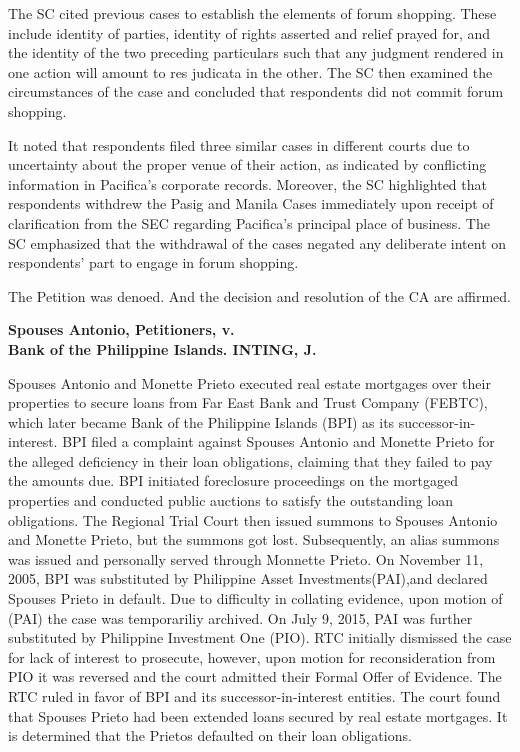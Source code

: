\documentclass[
12pt,
oneside,
onehalfspacing,
headsepline
]{DigestCollection}
\begin{document}
The SC cited previous cases to establish the elements of forum shopping. These include identity of parties, identity of rights asserted and relief prayed for, and the identity of the two preceding particulars such that any judgment rendered in one action will amount to res judicata in the other. The SC then examined the circumstances of the case and concluded that respondents did not commit forum shopping.

It noted that respondents filed three similar cases in different courts due to uncertainty about the proper venue of their action, as indicated by conflicting information in Pacifica's corporate records. Moreover, the SC highlighted that respondents withdrew the Pasig and Manila Cases immediately upon receipt of clarification from the SEC regarding Pacifica's principal place of business. The SC emphasized that the withdrawal of the cases negated any deliberate intent on respondents' part to engage in forum shopping.

The Petition was denoed. And the decision and resolution of the CA are affirmed.

\label{dab24c80-0a0f-11ef-932c-63c852f65e48}


\noindent\textbf{Spouses Antonio, Petitioners, v. \\Bank of the Philippine Islands. INTING, J.}\vspace{0.4cm}

Spouses Antonio and Monette Prieto executed real estate mortgages over their properties to secure loans from Far East Bank and Trust Company (FEBTC), which later became Bank of the Philippine Islands (BPI) as its successor-in-interest. BPI filed a complaint against Spouses Antonio and Monette Prieto for the alleged deficiency in their loan obligations, claiming that they failed to pay the amounts due. BPI initiated foreclosure proceedings on the mortgaged properties and conducted public auctions to satisfy the outstanding loan obligations. The Regional Trial Court then issued summons to Spouses Antonio and Monette Prieto, but the summons got lost. Subsequently, an alias summons was issued and personally served through Monnette Prieto. On November 11, 2005, BPI was substituted by Philippine Asset Investments(PAI),and declared Spouses Prieto in default. Due to difficulty in collating evidence, upon motion of (PAI) the case was temporariliy archived. On July 9, 2015, PAI was further substituted by Philippine Investment One (PIO). RTC initially dismissed the case for lack of interest to prosecute, however, upon motion for reconsideration from PIO it was reversed and the court admitted their Formal Offer of Evidence. The RTC ruled in favor of BPI and its successor-in-interest entities. The court found that Spouses Prieto had been extended loans secured by real estate mortgages. It is determined that the Prietos defaulted on their loan obligations.
\end{document}
